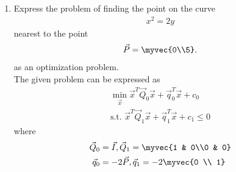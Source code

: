 \renewcommand{\theequation}{\theenumi}
\begin{enumerate}[label=\arabic*.,ref=\thesection.\theenumi]

\item
	\label{prob:dist_pt_parab_sdp}
Express the problem of 
finding the point on the curve 
\begin{align}
\label{eq:dist_pt_parab_sdp}
x^2 = 2y
\end{align}
%
nearest to the point 
\begin{align}
\vec{P} = \myvec{0\\5}.  
\end{align}
%
as an optimization problem.
\\
\solution The given problem can be expressed as
%
\begin{align}
\label{eq:qp_dist_pt_parab_sdp_qp}
\min_{\vec{x}}\vec{x}^T\vec{Q}_0\vec{x}+\vec{q}_0^T\vec{x}+c_0
\\
\text{s.t. }\vec{x}^T\vec{Q}_1\vec{x} + \vec{q}_1^T\vec{x} +c_1 \le 0
\end{align}
%
%
where
%
\begin{align}
\vec{Q}_0 &= \vec{I}, \vec{Q}_1 = \myvec{1 & 0\\0 & 0}
\\
\vec{q}_0 &=-2\vec{P}, \vec{q}_1 = -2\myvec{0 \\ 1}
\\

\end{align}
\end{enumerate}
